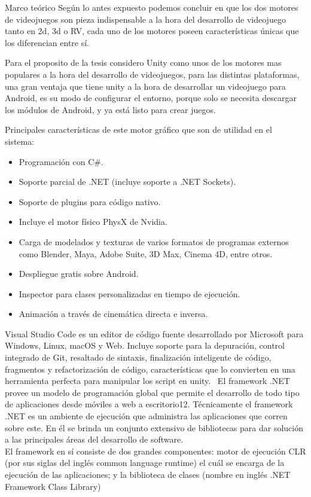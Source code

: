 \begin{thesischapter}{1} {Marco teórico}
    Según lo antes expuesto podemos concluir en que los dos motores de videojuegos son pieza indispensable a la hora del desarrollo
    de videojuego tanto en 2d, 3d o RV, cada uno de los motores poseen características únicas que los diferencian entre sí.
    
    \vspace{2pt}
    Para el proposito de la tesis considero Unity como unos de los motores mas populares a la hora del desarrollo
    de videojuegos, para las distintas plataformas, una gran ventaja que tiene unity a la hora de
    desarrollar un videojuego para Android, es su modo de configurar el entorno, porque solo se necesita descargar los módulos de 
    Android, y ya está listo para crear juegos.
     
    \vspace{5pt}
    Principales características de este motor gráfico que son de utilidad en el sistema:~\cite{unity3d}
    \begin{itemize}
        \item Programación con C\#.
        \item Soporte parcial de .NET (incluye soporte a .NET Sockets).
        \item Soporte de plugins para código nativo.
        \item Incluye el motor físico PhysX de Nvidia.
        \item Carga de modelados y texturas de varios formatos de programas externos como Blender, Maya, Adobe Suite, 3D Max, Cinema 4D, entre otros.
        \item Despliegue gratis sobre Android.
        \item Inspector para clases personalizadas en tiempo de ejecución.
        \item Animación a través de cinemática directa e inversa.
    \end{itemize}

    Visual Studio Code es un editor de código fuente desarrollado por Microsoft para
    Windows, Linux, macOS y Web. Incluye soporte para la depuración, control
    integrado de Git, resaltado de sintaxis, finalización inteligente de código, fragmentos
    y refactorización de código, características que lo convierten en una herramienta
    perfecta para manipular los script en unity.~\cite{vscode}
    El framework .NET provee un modelo de programación global que permite el
    desarrollo de todo tipo de aplicaciones desde móviles a web a escritorio12.
    Técnicamente el framework .NET es un ambiente de ejecución que administra las
    aplicaciones que corren sobre este. En él se brinda un conjunto extensivo de
    bibliotecas para dar solución a las principales áreas del desarrollo de software.\\
    El framework en sí consiste de dos grandes componentes: motor de ejecución CLR
    (por sus siglas del inglés common language runtime) el cuál se encarga de la
    ejecución de las aplicaciones; y la biblioteca de clases (nombre en inglés .NET
    Framework Class Library)~\cite{netframework}


\end{thesischapter}
